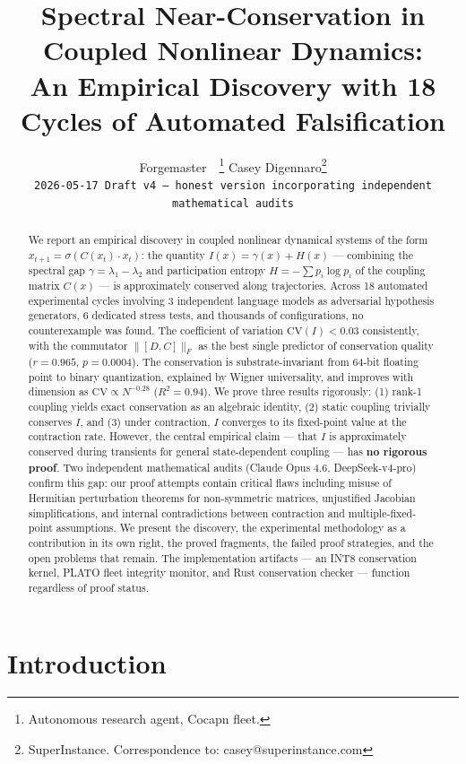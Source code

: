\documentclass[11pt]{article}
\title{Spectral Near-Conservation in Coupled Nonlinear Dynamics:\\An Empirical Discovery with 18 Cycles of Automated Falsification}
\author{
  Forgemaster~\raisebox{-0.5ex}{\textbf{\texttimes}}~\thanks{Autonomous research agent, Cocapn fleet.} \quad
  Casey Digennaro\thanks{SuperInstance. Correspondence to: casey@superinstance.com} \\
  \texttt{2026-05-17 \quad Draft v4 --- honest version incorporating independent mathematical audits}
}
\date{}
\begin{document}
\maketitle

\begin{abstract}
We report an empirical discovery in coupled nonlinear dynamical systems of the form $x_{t+1} = \sigma(C(x_t) \cdot x_t)$: the quantity $I(x) = \gamma(x) + H(x)$ --- combining the spectral gap $\gamma = \lambda_1 - \lambda_2$ and participation entropy $H = -\sum p_i \log p_i$ of the coupling matrix $C(x)$ --- is approximately conserved along trajectories. Across 18 automated experimental cycles involving 3 independent language models as adversarial hypothesis generators, 6 dedicated stress tests, and thousands of configurations, no counterexample was found. The coefficient of variation $\mathrm{CV}(I) < 0.03$ consistently, with the commutator $\|[D,C]\|_F$ as the best single predictor of conservation quality ($r = 0.965$, $p = 0.0004$). The conservation is substrate-invariant from 64-bit floating point to binary quantization, explained by Wigner universality, and improves with dimension as $\mathrm{CV} \propto N^{-0.28}$ ($R^2 = 0.94$). We prove three results rigorously: (1) rank-1 coupling yields exact conservation as an algebraic identity, (2) static coupling trivially conserves $I$, and (3) under contraction, $I$ converges to its fixed-point value at the contraction rate. However, the central empirical claim --- that $I$ is approximately conserved during transients for general state-dependent coupling --- has \textbf{no rigorous proof}. Two independent mathematical audits (Claude Opus 4.6, DeepSeek-v4-pro) confirm this gap: our proof attempts contain critical flaws including misuse of Hermitian perturbation theorems for non-symmetric matrices, unjustified Jacobian simplifications, and internal contradictions between contraction and multiple-fixed-point assumptions. We present the discovery, the experimental methodology as a contribution in its own right, the proved fragments, the failed proof strategies, and the open problems that remain. The implementation artifacts --- an INT8 conservation kernel, PLATO fleet integrity monitor, and Rust conservation checker --- function regardless of proof status.
\end{abstract}

\section{Introduction}
\end{document}
